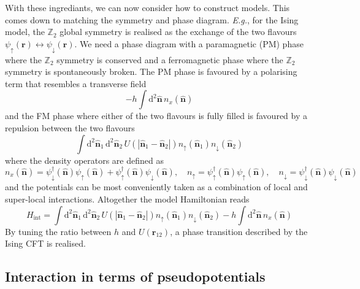 \documentclass{timesjhep}
\begin{document}
With these ingrediants, we can now consider how to construct models. This comes down to matching the symmetry and phase diagram. \textit{E.g.}, for the Ising model, the $\mathbb{Z}_2$ global symmetry is realised as the exchange of the two flavours $\psi_\uparrow(\mathbf{r})\leftrightarrow\psi_\downarrow(\mathbf{r})$. We need a phase diagram with a paramagnetic (PM) phase where the $\mathbb{Z}_2$ symmetry is conserved and a ferromagnetic phase where the $\mathbb{Z}_2$ symmetry is spontaneously broken. The PM phase is favoured by a polarising term that resembles a transverse field
\begin{equation*}
    -h\int\mathrm{d}^2\hat{\mathbf{n}}\,n_x(\hat{\mathbf{n}})
\end{equation*}
and the FM phase where either of the two flavours is fully filled is favoured by a repulsion between the two flavours 
\begin{equation*}
    \int\mathrm{d}^2\hat{\mathbf{n}}_1\,\mathrm{d}^2\hat{\mathbf{n}}_2\,U(|\hat{\mathbf{n}}_1-\hat{\mathbf{n}}_2|)n_\uparrow(\hat{\mathbf{n}}_1)n_\downarrow(\hat{\mathbf{n}}_2) 
\end{equation*} 
where the density operators are defined as 
\begin{equation*}
    n_x(\hat{\mathbf{n}})=\psi^\dagger_\downarrow(\hat{\mathbf{n}})\psi_\uparrow(\hat{\mathbf{n}})+\psi^\dagger_\uparrow(\hat{\mathbf{n}})\psi_\downarrow(\hat{\mathbf{n}}),\quad n_\uparrow=\psi^\dagger_\uparrow(\hat{\mathbf{n}})\psi_\uparrow(\hat{\mathbf{n}}),\quad n_\downarrow=\psi^\dagger_\downarrow(\hat{\mathbf{n}})\psi_\downarrow(\hat{\mathbf{n}}) 
\end{equation*}
and the potentials can be most conveniently taken as a combination of local and super-local interactions. Altogether the model Hamiltonian reads 
\begin{equation}
    H_\mathrm{int}=\int\mathrm{d}^2\hat{\mathbf{n}}_1\,\mathrm{d}^2\hat{\mathbf{n}}_2\,U(|\hat{\mathbf{n}}_1-\hat{\mathbf{n}}_2|)n_↑(\hat{\mathbf{n}}_1)n_\downarrow(\hat{\mathbf{n}}_2)-h\int\mathrm{d}^2\hat{\mathbf{n}}\,n_x(\hat{\mathbf{n}})
    \label{eq:ising_hmt}
\end{equation}
By tuning the ratio between $h$ and $U(\mathbf{r}_{12})$, a phase transition described by the Ising CFT is realised. 

\subsection{Interaction in terms of pseudopotentials}
\label{sec:construct_pspot}
\end{document}
